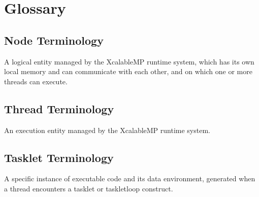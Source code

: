 \newcommand{\namelistlabel}[1]{\mbox{#1}\hfil}
\newenvironment{namelist}[1]{%
\begin{list}{}
       {\let\makelabel\namelistlabel
        \settowidth{\labelwidth}{#1}
        \setlength{\leftmargin}{1.3\labelwidth}
}
}{%
\end{list}}

\newcommand{\gitem}[1]{\item[{\parbox[b]{3.3cm}{\raggedleft \bf \Term{#1}}}]}


\section{Glossary}\label{sec:glossary}

\subsection{Node Terminology}

\begin{namelist}{entire node setxxxx}

\gitem{node}

  A logical entity managed by the XcalableMP runtime system, which has
  its own local memory and can communicate with each other, and on which
  one or more threads can execute.

\end{namelist}

\subsection{Thread Terminology}

\begin{namelist}{entire node setxxxx}

\gitem{thread}

  An execution entity managed by the XcalableMP runtime system.

\end{namelist}

\subsection{Tasklet Terminology}

\begin{namelist}{entire node setxxxx}

\gitem{tasklet}

  A specific instance of executable code and its data environment,
  generated when a thread encounters a tasklet or taskletloop
  construct.

\end{namelist}
